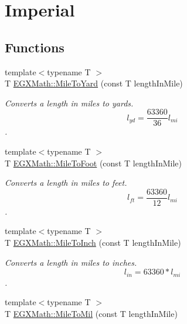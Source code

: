 \hypertarget{group___e_g_x_math-_conversions-_length_conversions-_imperial-_mile-_imperial}{}\section{Imperial}
\label{group___e_g_x_math-_conversions-_length_conversions-_imperial-_mile-_imperial}
\subsection*{Functions}
\begin{DoxyCompactItemize}
\item 
{\footnotesize template$<$typename T $>$ }\\T \mbox{\hyperlink{group___e_g_x_math-_conversions-_length_conversions-_imperial-_mile-_imperial_ga21dab1c2a6d7ef3bbf0d611ce5665018}{E\+G\+X\+Math\+::\+Mile\+To\+Yard}} (const T length\+In\+Mile)
\begin{DoxyCompactList}\small\item\em Converts a length in miles to yards. \[ l_{yd}= \frac{63360}{36} l_{mi} \]. \end{DoxyCompactList}\item 
{\footnotesize template$<$typename T $>$ }\\T \mbox{\hyperlink{group___e_g_x_math-_conversions-_length_conversions-_imperial-_mile-_imperial_gafdc7f1f7887e48f18cb0d324b719a677}{E\+G\+X\+Math\+::\+Mile\+To\+Foot}} (const T length\+In\+Mile)
\begin{DoxyCompactList}\small\item\em Converts a length in miles to feet. \[ l_{ft}= \frac{63360}{12} l_{mi} \]. \end{DoxyCompactList}\item 
{\footnotesize template$<$typename T $>$ }\\T \mbox{\hyperlink{group___e_g_x_math-_conversions-_length_conversions-_imperial-_mile-_imperial_gaa00476d5ed2d329e62b2e68c283b6046}{E\+G\+X\+Math\+::\+Mile\+To\+Inch}} (const T length\+In\+Mile)
\begin{DoxyCompactList}\small\item\em Converts a length in miles to inches. \[ l_{in}=63360 * l_{mi} \]. \end{DoxyCompactList}\item 
{\footnotesize template$<$typename T $>$ }\\T \mbox{\hyperlink{group___e_g_x_math-_conversions-_length_conversions-_imperial-_mile-_imperial_ga8f210f6be39b6ebd203e309b53556d22}{E\+G\+X\+Math\+::\+Mile\+To\+Mil}} (const T length\+In\+Mile)

\end{DoxyCompactItemize}
